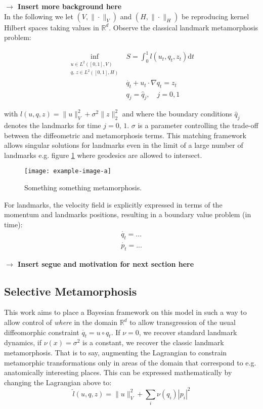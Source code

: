 \documentclass{article}
\newcommand{\norm}[2]{\| #1 \|_{ #2 }}
\newcommand{\vnorm}[1]{\norm{ #1 }{V}}
\newcommand{\hnorm}[1]{\norm{ #1 }{H}}
\newcommand{\ltwonorm}[1]{\norm{ #1 }{2}}
\newcommand{\diff}[1]{\text{d} #1}
\newcommand{\Rd}{\mathbb{R}^{d}}
\begin{document}
\textbf{$\longrightarrow$ Insert more background here}\\

In the following we let $(V,\vnorm{\cdot})$ and $(H,\hnorm{\cdot})$ be
reproducing kernel Hilbert spaces taking values in $\Rd$. Observe the classical
landmark metamorphosis problem: 

\begin{subequations}
\begin{align}
\inf_{\substack{u\in L^2([0,1],V)\\q,\, z \in L^2([0,1],H)}} & S = \int_0^1
l(u_t, q_t, z_t)\diff{t}\\
    & \dot{q_t} + u_t \cdot \nabla q_t = z_t \\
    & q_j = \hat q_j, \quad j=0,1
\end{align}
\end{subequations}

with $l(u, q, z) = \vnorm{u}^2 + \sigma^2\ltwonorm{z}^2$ and where the boundary
conditions $\hat q_j$ denotes the landmarks for time $j=0,\,1$. $\sigma$
is a parameter controlling the trade-off between the diffeometric and
metamorphosis terms. This matching framework allows singular solutions for
landmarks even in the limit of a large number of landmarks e.g. figure
\ref{fig:classic_mm} where geodesics are allowed to intersect.

\begin{figure}
  \centering
  \texttt{[image: example-image-a]}
  \caption{Something something metamorphosis.}
  \label{fig:classic_mm}
\end{figure}

For landmarks, the velocity field is explicitly expressed in terms of the
momentum and landmarks positions, resulting in a boundary value problem (in
time):
\begin{subequations}
\begin{align}
\dot{q_t} = ...\\
\dot{p_t} = ...
\end{align}
\end{subequations}

\textbf{$\longrightarrow$ Insert segue and motivation for next section here}

\subsection{Selective Metamorphosis}\label{sec:select_mm}

This work aims to place a Bayesian framework on this model in such a way to
allow control of \emph{where} in the domain $\Rd$ to allow transgression of the
usual diffeomorphic constraint $\dot{q_t} = u\circ q_t$. If $\nu=0$, we recover
standard landmark dynamics, if $\nu(x)=\sigma^2$ is a constant, we recover the
classic landmark metamorphosis. That is to say, augmenting the Lagrangian to
constrain metamorphic transformations only in areas of the domain that
correspond to e.g. anatomically interesting places.  This can be expressed
mathematically by changing the Lagrangian above to:
\[
	\hat l(u, q, z) = \vnorm{u}^2 +  \sum_i \nu(q_i)|p_i|^2
\]
\end{document}

